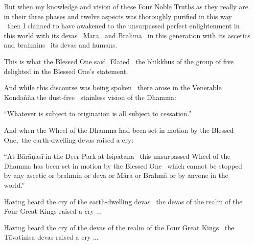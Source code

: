 \begin{english-hang}
  But when my knowledge and vision of these Four Noble Truths as they really are in their three phases and twelve aspects was thoroughly purified in this way \breathmark\ then I claimed to have awakened to the unsurpassed perfect enlightenment in this world with its devas \breathmark\ Māra \breathmark\ and Brahmā \breathmark\ in this generation with its ascetics and brahmins \breathmark\ its devas and humans.
\end{english-hang}

\begin{english-hang}
  This is what the Blessed One said. Elated \breathmark\ the bhikkhus of the group of five delighted in the Blessed One's statement.
\end{english-hang}

\begin{english-hang}
  And while this discourse was being spoken \breathmark\ there arose in the Venerable Kondañña the dust-free \breathmark\ stainless vision of the Dhamma:
\end{english-hang}

\begin{english-hang}
  ``Whatever is subject to origination is all subject to cessation.''
\end{english-hang}

\begin{english-hang}
  And when the Wheel of the Dhamma had been set in motion by the Blessed One, the earth-dwelling devas raised a cry:
\end{english-hang}

\begin{english-hang}
  ``At Bārāṇasī in the Deer Park at Isipatana \breathmark\ this unsurpassed Wheel of the Dhamma has been set in motion by the Blessed One \breathmark\ which cannot be stopped by any ascetic or brahmin or deva or Māra or Brahmā or by anyone in the world.''
\end{english-hang}

\begin{english-hang}
  Having heard the cry of the earth-dwelling devas \breathmark\ the devas of the realm of the Four Great Kings raised a cry ...
\end{english-hang}

\begin{english-hang}
  Having heard the cry of the devas of the realm of the Four Great Kings \breathmark\ the Tāvatiṁsa devas raised a cry ...
\end{english-hang}

